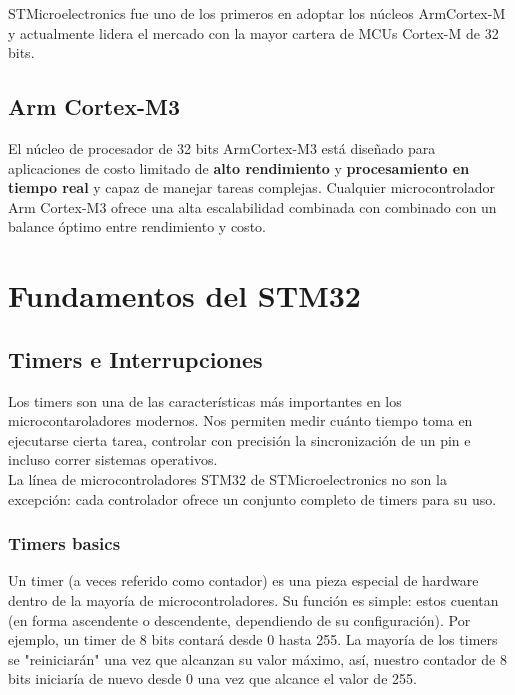 \documentclass[12pt,a4paper]{book}
\begin{document}
	\noindent STMicroelectronics fue uno de los primeros en adoptar los núcleos Arm\textregistered Cortex\textregistered -M y actualmente lidera el mercado con la mayor cartera de MCUs Cortex\textregistered -M de 32 bits.
	
	\section{Arm Cortex\textregistered-M3}
	El núcleo de procesador de 32 bits Arm\textregistered Cortex\textregistered-M3 está diseñado para aplicaciones de costo limitado de \textbf{alto rendimiento} y \textbf{procesamiento en tiempo real} y capaz de manejar tareas complejas. Cualquier microcontrolador Arm \textregistered Cortex\textregistered-M3 ofrece una alta escalabilidad combinada con combinado con un balance óptimo entre rendimiento y costo.
	 

	\chapter{Fundamentos del STM32}
	
	\section{Timers e Interrupciones}
	Los timers son una de las características más importantes en los microcontaroladores modernos. Nos permiten medir cuánto tiempo toma en ejecutarse cierta tarea, controlar con precisión la sincronización de un pin e incluso correr sistemas operativos.\\
	
	 \noindent La línea de microcontroladores STM32 de STMicroelectronics no son la excepción: cada controlador ofrece un conjunto completo de timers para su uso.
	 
	 \subsection{Timers basics}
	 Un timer (a veces referido como contador) es una pieza especial de hardware dentro de la mayoría de microcontroladores. Su función es simple: estos cuentan (en forma ascendente o descendente, dependiendo de su configuración). Por ejemplo, un timer de 8 bits contará desde 0 hasta 255. La mayoría de los timers se "reiniciarán" una vez que alcanzan su valor máximo, así, nuestro contador de 8 bits iniciaría de nuevo desde 0 una vez que alcance el valor de 255. \\
	 
\end{document}

